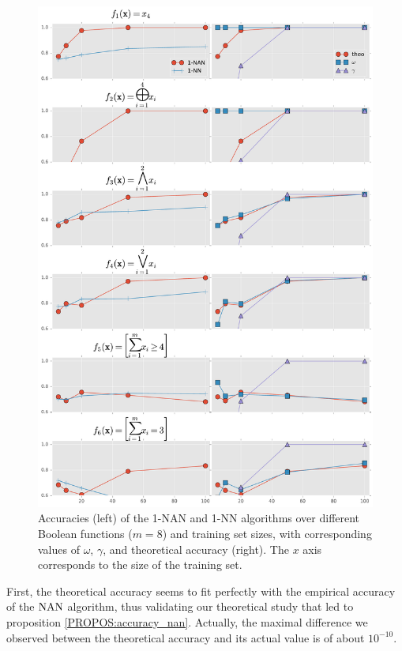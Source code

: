 \begin{figure}[!h]
\centering
  \includegraphics[scale=.50]{figures/nan_vs_nn_SUMMARY_dim8_nexp15.pdf}
  \caption{Accuracies (left) of the 1-NAN and 1-NN algorithms over different
  Boolean functions ($m = 8$) and training set sizes, with corresponding values
  of $\omega$, $\gamma$, and theoretical accuracy (right). The $x$ axis
  corresponds to the size of the training set.}
\label{FIG:nan_vs_nn}
\end{figure}

First, the theoretical accuracy seems to fit perfectly with the empirical
accuracy of the $\mbox{NAN}$ algorithm, thus validating our theoretical study that
led to proposition \ref{PROPOS:accuracy_nan}. Actually, the maximal difference
we observed between the theoretical accuracy and its actual value is of about
$10^{-10}$.


